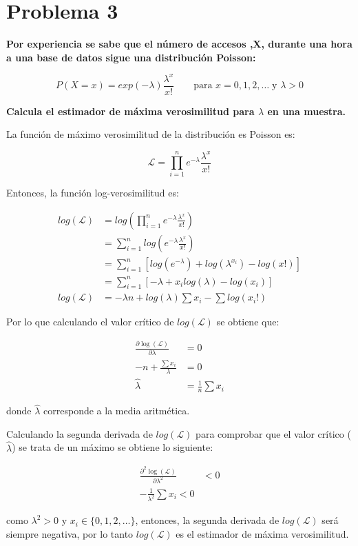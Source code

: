 \section*{Problema 3}

\textbf{Por experiencia se sabe que el número de  accesos ,X, durante una hora a una base de datos sigue una distribución Poisson:}

\begin{equation*}
	P(X=x) = exp(-\lambda) \frac{\lambda^x}{x!} \qquad \text{para } x=0,1,2,\dots \; \text{y } \lambda>0
\end{equation*}

\textbf{Calcula el estimador de máxima verosimilitud para $\lambda$ en una muestra.}

La función de máximo verosimilitud de la distribución es Poisson es:

\begin{equation*}
	\mathcal{L} = \prod_{i=1}^n e^{-\lambda} \frac{\lambda^x}{x!}
\end{equation*}

Entonces, la función log-verosimilitud es:

\begin{align*}
	log(\mathcal{L}) & = log\left (\prod_{i=1}^n e^{-\lambda} \frac{\lambda^x}{x!}\right )            \\
	                 & = \sum_{i=1}^n log \left ( e^{-\lambda} \frac{\lambda^x}{x!}\right )           \\
	                 & = \sum_{i=1}^n \left [ log(e^{-\lambda})+ log(\lambda^{x_i}) -log(x!) \right ] \\
	                 & = \sum_{i=1}^n \left [ -\lambda +x_i log(\lambda) -log(x_i)\right ]            \\
	log(\mathcal{L}) & = -\lambda n + log(\lambda) \sum x_i - \sum log(x_i!)
\end{align*}

Por lo que calculando el valor crítico de $log(\mathcal{L})$ se obtiene que:

\begin{align*}
	\frac{\partial \log(\mathcal{L})}{\partial \lambda} & = 0                    \\
	-n  + \frac{\sum x_i}{\lambda}                      & = 0                    \\
	\hat{\lambda}                                       & = \frac{1}{n} \sum x_i
\end{align*}

donde $\hat{\lambda}$ corresponde a la media aritmética.

Calculando la segunda derivada de $log(\mathcal{L})$ para comprobar que el valor crítico ($\hat{\lambda}$) se trata de un máximo se obtiene lo siguiente:

\begin{align*}
	\frac{\partial^2 \log(\mathcal{L})}{\partial \lambda^2} & < 0 \\
	-\frac{1}{\lambda^2} \sum x_i  < 0
\end{align*}

como $\lambda^2 > 0$ y $x_i \in \{0,1,2,\dots\}$, entonces, la segunda derivada de $log(\mathcal{L})$ será siempre negativa, por lo tanto $log(\mathcal{L})$ es el estimador de máxima verosimilitud.
